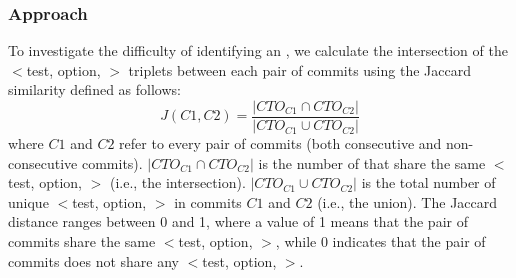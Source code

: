 \subsubsection*{Approach}

To investigate the difficulty of identifying an \inconsistent, we calculate the intersection of the $<$test, option, \inconsistent$>$ triplets between each pair of commits %
using the Jaccard similarity defined as follows:
\begin{equation}
J(C1,C2) = \frac{|CTO_{C1} \cap CTO_{C2}|}{|CTO_{C1} \cup CTO_{C2}|}
\end{equation} 
where $C1$ and $C2$ refer to every pair of commits (both consecutive and non-consecutive commits). $|CTO_{C1} \cap CTO_{C2}|$ is the number of \instance that share the same $<$test, option, \inconsistent$>$ (i.e., the intersection). 
$|CTO_{C1} \cup CTO_{C2}|$ is the total number of unique $<$test, option, \inconsistent$>$ in commits $C1$ and $C2$ (i.e., the union). %
The Jaccard distance ranges %
between 0 %
and 1, where a value of 1 means that the pair of commits share the same $<$test, option, \inconsistent$>$, while 0 indicates that the pair of commits does not share any $<$test, option, \inconsistent$>$.

